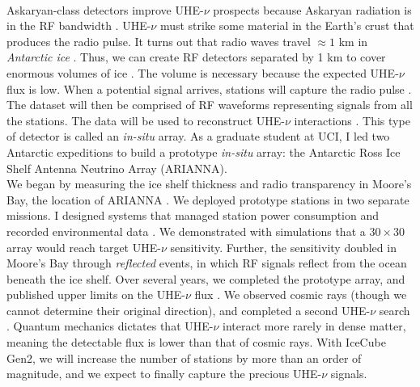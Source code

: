 \documentclass[../../main.tex]{subfiles}
\begin{document}
\\
\vspace{0.15cm}
Askaryan-class detectors improve UHE-$\nu$ prospects because Askaryan radiation is in the RF bandwidth \cite{10.1016/j.astropartphys.2017.03.008}.  UHE-$\nu$ must strike some material in the Earth's crust that produces the radio pulse.  It turns out that radio waves travel $\approx 1$ km in \textit{Antarctic ice} \cite{10.3189/2015jog14j214} \cite{10.3189/2015jog15j057} \cite{barwick_besson_gorham_saltzberg_2005}.  Thus, we can create RF detectors separated by 1 km to cover enormous volumes of ice \cite{10.1109/tns.2015.2468182}.  The volume is necessary because the expected UHE-$\nu$ flux is low.  When a potential signal arrives, stations will capture the radio pulse \cite{sst}.  The dataset will then be comprised of RF waveforms representing signals from all the stations.  The data will be used to reconstruct UHE-$\nu$ interactions \cite{10.1088/1475-7516/2019/11/030} \cite{10.1088/1748-0221/15/09/p09039}.  This type of detector is called an \textit{in-situ} array.  As a graduate student at UCI, I led two Antarctic expeditions to build a prototype \textit{in-situ} array: the Antarctic Ross Ice Shelf Antenna Neutrino Array (ARIANNA).
\\
\vspace{0.15cm}
We began by measuring the ice shelf thickness and radio transparency in Moore's Bay, the location of ARIANNA \cite{icrc}.  We deployed prototype stations in two separate missions.  I designed systems that managed station power consumption and recorded environmental data \cite{10.1109/tns.2015.2468182} \cite{10.1016/j.nima.2010.09.032}.  We demonstrated with simulations that a $30 \times 30$ array would reach target UHE-$\nu$ sensitivity.  Further, the sensitivity doubled in Moore's Bay through \textit{reflected} events, in which RF signals reflect from the ocean beneath the ice shelf.  Over several years, we completed the prototype array, and published upper limits on the UHE-$\nu$ flux \cite{10.1016/j.astropartphys.2015.04.002}.  We observed cosmic rays \cite{cr} (though we cannot determine their original direction), and completed a second UHE-$\nu$ search \cite{4_5}.  Quantum mechanics dictates that UHE-$\nu$ interact more rarely in dense matter, meaning the detectable flux is lower than that of cosmic rays.  With IceCube Gen2, we will increase the number of stations by more than an order of magnitude, and we expect to finally capture the precious UHE-$\nu$ signals.
\\
\vspace{0.15cm}
\end{document}
